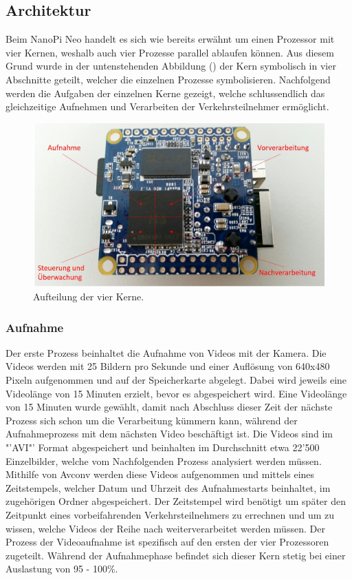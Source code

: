 \subsection{Architektur}
Beim NanoPi Neo handelt es sich wie bereits erwähnt um einen Prozessor mit vier Kernen, weshalb auch vier Prozesse parallel ablaufen können. Aus diesem Grund wurde in der untenstehenden Abbildung () der Kern symbolisch in vier Abschnitte geteilt, welcher die einzelnen Prozesse symbolisieren. Nachfolgend werden die Aufgaben der einzelnen Kerne gezeigt, welche schlussendlich das gleichzeitige Aufnehmen und Verarbeiten der Verkehrsteilnehmer ermöglicht.

\begin{figure}[H]
  \centering
  \includegraphics[height=0.49\textwidth]{Software/Architektur.jpg} 
  \caption{Aufteilung der vier Kerne.}
  \label{bArchitektur}
\end{figure}


\subsubsection{Aufnahme}
Der erste Prozess beinhaltet die Aufnahme von Videos mit der Kamera. Die Videos werden mit 25 Bildern pro Sekunde und einer Auflösung von 640x480 Pixeln aufgenommen und auf der Speicherkarte abgelegt. Dabei wird jeweils eine Videolänge von 15 Minuten erzielt, bevor es abgespeichert wird. Eine Videolänge von 15 Minuten wurde gewählt, damit nach Abschluss dieser Zeit der nächste Prozess sich schon um die Verarbeitung kümmern kann, während der Aufnahmeprozess mit dem nächsten Video beschäftigt ist.  Die Videos sind im "'AVI"' Format abgespeichert und beinhalten im Durchschnitt etwa 22'500 Einzelbilder, welche vom Nachfolgenden Prozess analysiert werden müssen. Mithilfe von Avconv werden diese Videos aufgenommen und mittels eines Zeitstempels, welcher Datum und Uhrzeit des Aufnahmestarts beinhaltet, im zugehörigen Ordner abgespeichert. Der Zeitstempel wird benötigt um später den Zeitpunkt eines vorbeifahrenden Verkehrsteilnehmers zu errechnen und um zu wissen, welche Videos der Reihe nach weiterverarbeitet werden müssen. Der Prozess der Videoaufnahme ist spezifisch auf den ersten der vier Prozessoren zugeteilt. Während der Aufnahmephase befindet sich dieser Kern stetig bei einer Auslastung von 95 - 100\%.

